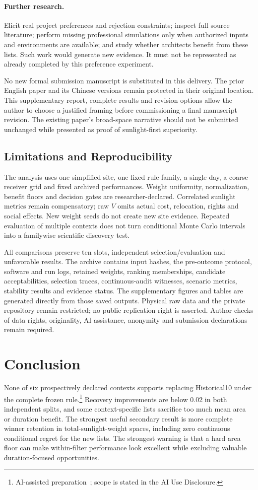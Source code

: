 \documentclass{llncs}
\newcommand{\aidraft}{\footnote{AI-assisted preparation~\cite{openai2026}; scope is stated in the AI Use Disclosure.}}
\begin{document}
\paragraph{Further research.} Elicit real project preferences and rejection constraints; inspect full source literature; perform missing professional simulations only when authorized inputs and environments are available; and study whether architects benefit from these lists. Such work would generate new evidence. It must not be represented as already completed by this preference experiment.

No new formal submission manuscript is substituted in this delivery. The prior English paper and its Chinese versions remain protected in their original location. This supplementary report, complete results and revision options allow the author to choose a justified framing before commissioning a final manuscript revision. The existing paper's broad-space narrative should not be submitted unchanged while presented as proof of sunlight-first superiority.

\subsection{Limitations and Reproducibility}
The analysis uses one simplified site, one fixed rule family, a single day, a coarse receiver grid and fixed archived performances. Weight uniformity, normalization, benefit floors and decision gates are researcher-declared. Correlated sunlight metrics remain compensatory; raw $V$ omits actual cost, relocation, rights and social effects. New weight seeds do not create new site evidence. Repeated evaluation of multiple contexts does not turn conditional Monte Carlo intervals into a familywise scientific discovery test.

All comparisons preserve ten slots, independent selection/evaluation and unfavorable results. The archive contains input hashes, the pre-outcome protocol, software and run logs, retained weights, ranking memberships, candidate acceptabilities, selection traces, continuous-audit witnesses, scenario metrics, stability results and evidence status. The supplementary figures and tables are generated directly from those saved outputs. Physical raw data and the private repository remain restricted; no public replication right is asserted. Author checks of data rights, originality, AI assistance, anonymity and submission declarations remain required.

\section{Conclusion}
None of six prospectively declared contexts supports replacing Historical10 under the complete frozen rule.\aidraft{} Recovery improvements are below 0.02 in both independent splits, and some context-specific lists sacrifice too much mean area or duration benefit. The strongest useful secondary result is more complete winner retention in total-sunlight-weight spaces, including zero continuous conditional regret for the new lists. The strongest warning is that a hard area floor can make within-filter performance look excellent while excluding valuable duration-focused opportunities.
\end{document}
